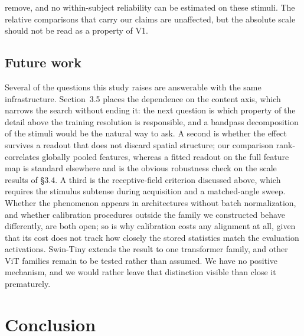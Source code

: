 \documentclass[10pt,twocolumn]{article}
\begin{document}
remove, and no within-subject reliability can be estimated on these stimuli. The relative comparisons that carry our claims are unaffected, but the absolute scale should not be read as a property of V1.

\subsection{Future work}

Several of the questions this study raises are answerable with the same infrastructure. Section~3.5 places the dependence on the content axis, which narrows the search without ending it: the next question is which property of the detail above the training resolution is responsible, and a bandpass decomposition of the stimuli would be the natural way to ask. A second is whether the effect survives a readout that does not discard spatial structure; our comparison rank-correlates globally pooled features, whereas a fitted readout on the full feature map is standard elsewhere and is the obvious robustness check on the scale results of \S3.4. A third is the receptive-field criterion discussed above, which requires the stimulus subtense during acquisition and a matched-angle sweep. Whether the phenomenon appears in architectures without batch normalization, and whether calibration procedures outside the family we constructed behave differently, are both open; so is why calibration costs any alignment at all, given that its cost does not track how closely the stored statistics match the evaluation activations. Swin-Tiny extends the result to one transformer family, and other ViT families remain to be tested rather than assumed. We have no positive mechanism, and we would rather leave that distinction visible than close it prematurely.

\section{Conclusion}
\end{document}
